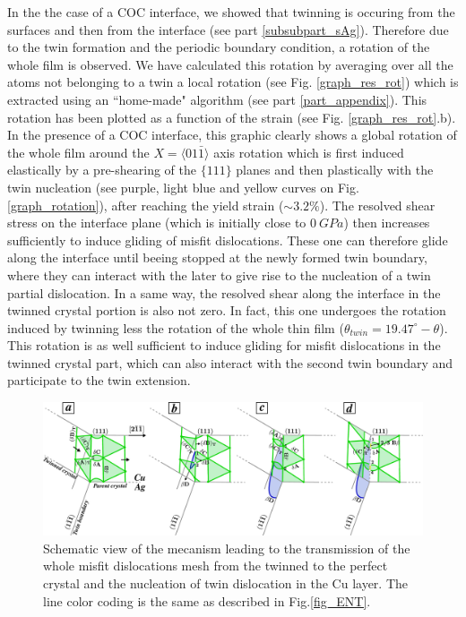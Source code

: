 \documentclass[final,3p,times,twocolumn]{elsarticle}
\begin{document}
In the the case of a COC interface, we showed that twinning is occuring from the surfaces and then from the interface (see part \ref{subsubpart_sAg}). Therefore due to the twin formation and the periodic boundary condition, a rotation of the whole film is observed. We have calculated this rotation by averaging over all the atoms not belonging to a twin a local rotation (see Fig. \ref{graph_res_rot}) which is extracted using an ``home-made" algorithm (see part \ref{part_appendix}). This rotation has been plotted as a function of the strain (see Fig. \ref{graph_res_rot}.b). In the presence of a COC interface, this graphic clearly shows a global rotation of the whole film around the $X=\langle01\bar{1}\rangle$ axis rotation which is first induced elastically by a pre-shearing of the $\lbrace111\rbrace$ planes and then plastically with the twin nucleation (see purple, light blue and yellow curves on Fig. \ref{graph_rotation}), after reaching the yield strain ($ \sim 3.2\% $). The resolved shear stress on the interface plane (which is initially close to $0~GPa$) then increases sufficiently to induce gliding of misfit dislocations. These one can therefore glide along the interface until beeing stopped at the newly formed twin boundary, where they can interact with the later to give rise to the nucleation of a twin partial dislocation. In a same way, the resolved shear along the interface in the twinned crystal portion is also not zero. In fact, this one undergoes the rotation induced by twinning less the rotation of the whole thin film ($\theta_{twin}=19.47^{\circ}-\theta$). This rotation is as well sufficient to induce gliding for misfit dislocations in the twinned crystal part, which can also interact with the second twin boundary and participate to the twin extension. 

\begin{figure}[!t]
	\begin{center}
		\includegraphics[width=150mm]{Pic/fig_SOR.eps} 
	\end{center}\caption{Schematic view of the mecanism leading to the transmission of the whole misfit dislocations mesh from the twinned to the perfect crystal and the nucleation of twin dislocation in the Cu layer. The line color coding is the same as described in Fig.\ref{fig_ENT}.}\label{fig_SOR}
\end{figure}
\end{document}
